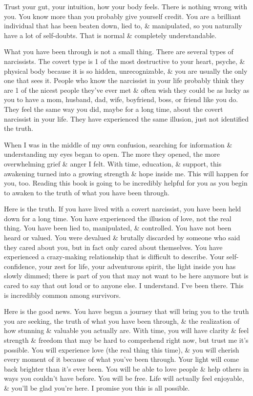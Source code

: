 \documentclass{article}
\numberwithin{equation}{section}
\begin{document}
Trust your gut, your intuition, how your body feels. There is nothing wrong with you. You know more than you probably give yourself credit. You are a brilliant individual that has been beaten down, lied to, \& manipulated, so you naturally have a lot of self-doubts. That is normal \& completely understandable.

What you have been through is not a small thing. There are several types of narcissists. The covert type is 1 of the most destructive to your heart, psyche, \& physical body because it is so hidden, unrecognizable, \& you are usually the only one that sees it. People who know the narcissist in your life probably think they are 1 of the nicest people they've ever met \& often wish they could be as lucky as you to have a mom, husband, dad, wife, boyfriend, boss, or friend like you do. They feel the same way you did, maybe for a long time, about the covert narcissist in your life. They have experienced the same illusion, just not identified the truth.

When I was in the middle of my own confusion, searching for information \& understanding my eyes began to open. The more they opened, the more overwhelming grief \& anger I felt. With time, education, \& support, this awakening turned into a growing strength \& hope inside me. This will happen for you, too. Reading this book is going to be incredibly helpful for you as you begin to awaken to the truth of what you have been through.

Here is the truth. If you have lived with a covert narcissist, you have been held down for a long time. You have experienced the illusion of love, not the real thing. You have been lied to, manipulated, \& controlled. You have not been heard or valued. You were devalued \& brutally discarded by someone who said they cared about you, but in fact only cared about themselves. You have experienced a crazy-making relationship that is difficult to describe. Your self-confidence, your zest for life, your adventurous spirit, the light inside you has slowly dimmed; there is part of you that may not want to be here anymore but is cared to say that out loud or to anyone else. I understand. I've been there. This is incredibly common among survivors.

Here is the good news. You have begun a journey that will bring you to the truth you are seeking, the truth of what you have been through, \& the realization of how stunning \& valuable you actually are. With time, you will have clarity \& feel strength \& freedom that may be hard to comprehend right now, but trust me it's possible. You will experience love (the real thing this time), \& you will cherish every moment of it because of what you've been through. Your light will come back brighter than it's ever been. You will be able to love people \& help others in ways you couldn't have before. You will be free. Life will actually feel enjoyable, \& you'll be glad you're here. I promise you this is all possible.
\end{document}
